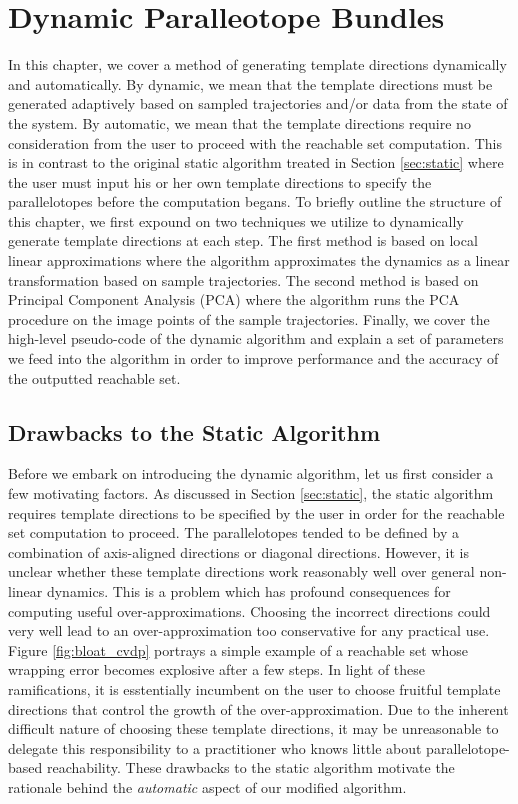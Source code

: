 \chapter{Dynamic Paralleotope Bundles}

In this chapter, we cover a method of generating template directions dynamically and automatically.
%
By dynamic, we mean that the template directions must be generated adaptively based on sampled trajectories and/or data from the state of the system.
%
By automatic, we mean that the template directions require no consideration from the user to proceed with the reachable set computation. This is in contrast to the original static algorithm treated in Section \ref{sec:static} where the user must input his or her own template directions to specify the parallelotopes before the computation begans.
%
To briefly outline the structure of this chapter, we first expound on two techniques we utilize to dynamically generate template directions at each step.
%
The first method is based on local linear approximations where the algorithm approximates the dynamics as a linear transformation based on sample trajectories.
%
The second method is based on Principal Component Analysis (PCA) where the algorithm runs the PCA procedure on the image points of the sample trajectories.
%
Finally, we cover the high-level pseudo-code of the dynamic algorithm and explain a set of parameters we feed into the algorithm in order to improve performance and the accuracy of the outputted reachable set.



\section{Drawbacks to the Static Algorithm}
Before we embark on introducing the dynamic algorithm, let us first consider a few motivating factors.
%
As discussed in Section \ref{sec:static}, the static algorithm requires template directions to be specified by the user in order for the reachable set computation to proceed.
%
The parallelotopes tended to be defined by a combination of axis-aligned directions or diagonal directions.
%
However, it is unclear whether these template directions work reasonably well over general non-linear dynamics.
%
This is a problem which has profound consequences for computing useful over-approximations.
%
Choosing the incorrect directions could very well lead to an over-approximation too conservative for any practical use.
%
Figure \ref{fig:bloat_cvdp} portrays a simple example of a reachable set whose wrapping error becomes explosive after a few steps.
%
In light of these ramifications, it is esstentially incumbent on the user to choose fruitful template directions that control the growth of the over-approximation.
%
Due to the inherent difficult nature of choosing these template directions, it may be unreasonable to delegate this responsibility to a practitioner who knows little about parallelotope-based reachability.
%
These drawbacks to the static algorithm motivate the rationale behind the \emph{automatic} aspect of our modified algorithm.

